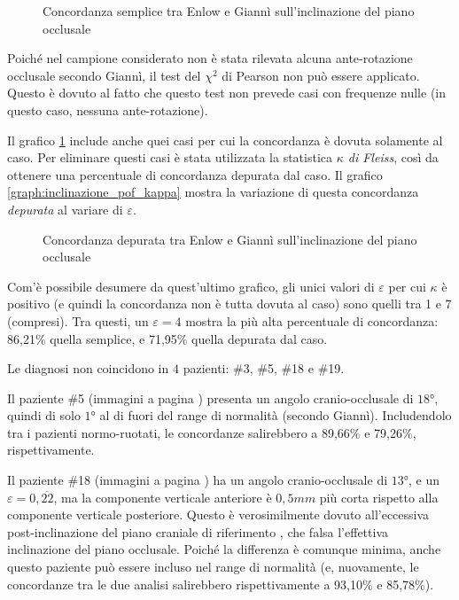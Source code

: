 \begin{figure}[ht!]
\centering

\caption{Concordanza semplice tra Enlow e Giannì sull'inclinazione del piano occlusale}
\label{graph:inclinazione_pof_concordanza}
\end{figure}

Poiché nel campione considerato non è stata rilevata alcuna ante-rotazione occlusale secondo Giannì, il test del $\chi^2$ di Pearson non può essere applicato. Questo è dovuto al fatto che questo test non prevede casi con frequenze nulle (in questo caso, nessuna ante-rotazione).

Il grafico \ref{graph:inclinazione_pof_concordanza} include anche quei casi per cui la concordanza è dovuta solamente al caso. Per eliminare questi casi è stata utilizzata la statistica \emph{$\kappa$ di Fleiss}, così da ottenere una percentuale di concordanza depurata dal caso. Il grafico \vref{graph:inclinazione_pof_kappa} mostra la variazione di questa concordanza \emph{depurata} al variare di $\varepsilon$.

\begin{figure}[ht!]
\centering

\caption{Concordanza depurata tra Enlow e Giannì sull'inclinazione del piano occlusale}
\label{graph:inclinazione_pof_kappa}
\end{figure}

Com'è possibile desumere da quest'ultimo grafico, gli unici valori di $\varepsilon$ per cui $\kappa$ è positivo (e quindi la concordanza non è tutta dovuta al caso) sono quelli tra 1 e 7 (compresi). Tra questi, un $\varepsilon = 4$ mostra la più alta percentuale di concordanza: 86,21\% quella semplice, e 71,95\% quella depurata dal caso.

Le diagnosi non coincidono in $4$ pazienti: \#3, \#5, \#18 e \#19.

Il paziente \#5 (immagini a pagina \pageref{paz:EMALO2001}) presenta un angolo cranio-occlusale di $18°$, quindi di solo $1°$ al di fuori del range di normalità (secondo Giannì). Includendolo tra i pazienti normo-ruotati, le concordanze salirebbero a 89,66\% e 79,26\%, rispettivamente.

Il paziente \#18 (immagini a pagina \pageref{paz:TILO1999}) ha un angolo cranio-occlusale di $13°$, e un $\varepsilon = 0,\overline{22}$, ma la componente verticale anteriore è $0,5 mm$ più corta rispetto alla componente verticale posteriore. Questo è verosimilmente dovuto all'eccessiva post-inclinazione del piano craniale di riferimento , che falsa l'effettiva inclinazione del piano occlusale. Poiché la differenza è comunque minima, anche questo paziente può essere incluso nel range di normalità (e, nuovamente, le concordanze tra le due analisi salirebbero rispettivamente a 93,10\% e 85,78\%).

